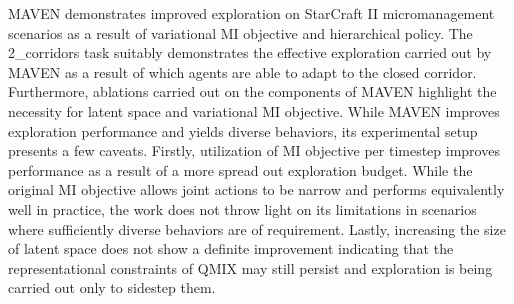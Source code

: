 \documentclass[11pt,letterpaper]{article}
\begin{document}
MAVEN demonstrates improved exploration on StarCraft II micromanagement scenarios as a result of variational MI objective and hierarchical policy. The 2\_corridors task suitably demonstrates the effective exploration carried out by MAVEN as a result of which agents are able to adapt to the closed corridor. Furthermore, ablations carried out on the components of MAVEN highlight the necessity for latent space and variational MI objective. While MAVEN improves exploration performance and yields diverse behaviors, its experimental setup presents a few caveats. Firstly, utilization of MI objective per timestep improves performance as a result of a more spread out exploration budget. While the original MI objective allows joint actions to be narrow and performs equivalently well in practice, the work does not throw light on its limitations in scenarios where sufficiently diverse behaviors are of requirement. Lastly, increasing the size of latent space does not show a definite improvement indicating that the representational constraints of QMIX may still persist and exploration is being carried out only to sidestep them. 
\end{document}
